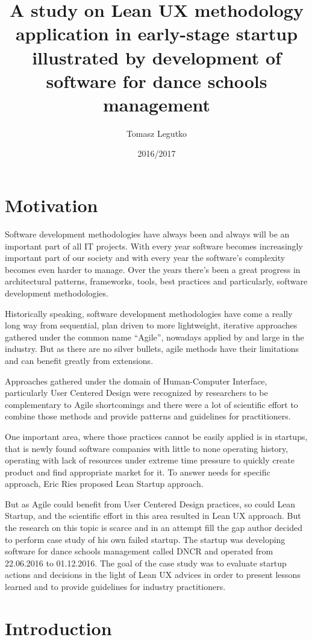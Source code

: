 \documentclass{article}
\title{A study on Lean UX methodology application in early-stage startup illustrated by development of software for dance schools management}
\author{Tomasz Legutko}
\date{2016/2017}
\begin{document}

\tableofcontents

\section{Motivation}
Software development methodologies have always been and always will be an important part of all IT projects. With every year software becomes increasingly important part of our society and with every year the software's complexity becomes even harder to manage. Over the years there's been a great progress in architectural patterns, frameworks, tools, best practices and particularly, software development methodologies.

Historically speaking, software development methodologies have come a really long way from sequential, plan driven to more lightweight, iterative approaches gathered under the common name ``Agile'', nowadays applied by and large in the industry. But as there are no silver bullets, agile methods have their limitations and can benefit greatly from extensions.
 
Approaches gathered under the domain of Human-Computer Interface, particularly User Centered Design were recognized by researchers to be complementary to Agile shortcomings and there were a lot of scientific effort to combine those methods and provide patterns and guidelines for practitioners. 

One important area, where those practices cannot be easily applied is in startups, that is newly found software companies with little to none operating history, operating with lack of resources under extreme time pressure to quickly create product and find appropriate market for it. To answer needs for specific approach, Eric Ries proposed Lean Startup approach.

But as Agile could benefit from User Centered Design practices, so could Lean Startup, and the scientific effort in this area resulted in Lean UX approach. But the research on this topic is scarce and in an attempt fill the gap author decided to perform case study of his own failed startup. The startup was developing software for dance schools management called DNCR and operated from 22.06.2016 to 01.12.2016. The goal of the case study was to evaluate startup actions and decisions in the light of Lean UX advices in order to present lessons learned and to provide guidelines for industry practitioners.

\section{Introduction}
\end{document}
